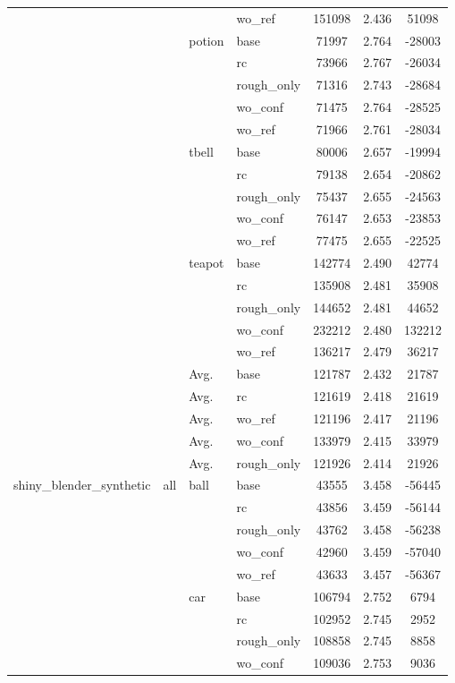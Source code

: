 \begin{table}[t]
{\begin{tabular}{llllccc}
 &  &  & wo\_ref & 151098 & 2.436 & 51098 \\
 &  & potion & base & 71997 & 2.764 & -28003 \\
 &  &  & rc & 73966 & 2.767 & -26034 \\
 &  &  & rough\_only & 71316 & 2.743 & -28684 \\
 &  &  & wo\_conf & 71475 & 2.764 & -28525 \\
 &  &  & wo\_ref & 71966 & 2.761 & -28034 \\
 &  & tbell & base & 80006 & 2.657 & -19994 \\
 &  &  & rc & 79138 & 2.654 & -20862 \\
 &  &  & rough\_only & 75437 & 2.655 & -24563 \\
 &  &  & wo\_conf & 76147 & 2.653 & -23853 \\
 &  &  & wo\_ref & 77475 & 2.655 & -22525 \\
 &  & teapot & base & 142774 & 2.490 & 42774 \\
 &  &  & rc & 135908 & 2.481 & 35908 \\
 &  &  & rough\_only & 144652 & 2.481 & 44652 \\
 &  &  & wo\_conf & 232212 & 2.480 & 132212 \\
 &  &  & wo\_ref & 136217 & 2.479 & 36217 \\
 & & Avg. & base & 121787 & 2.432 & 21787 \\
 & & Avg. & rc & 121619 & 2.418 & 21619 \\
 & & Avg. & wo\_ref & 121196 & 2.417 & 21196 \\
 & & Avg. & wo\_conf & 133979 & 2.415 & 33979 \\
 & & Avg. & rough\_only & 121926 & 2.414 & 21926 \\
\midrule
shiny\_blender\_synthetic & all & ball & base & 43555 & 3.458 & -56445 \\
 &  &  & rc & 43856 & 3.459 & -56144 \\
 &  &  & rough\_only & 43762 & 3.458 & -56238 \\
 &  &  & wo\_conf & 42960 & 3.459 & -57040 \\
 &  &  & wo\_ref & 43633 & 3.457 & -56367 \\
 &  & car & base & 106794 & 2.752 & 6794 \\
 &  &  & rc & 102952 & 2.745 & 2952 \\
 &  &  & rough\_only & 108858 & 2.745 & 8858 \\
 &  &  & wo\_conf & 109036 & 2.753 & 9036 \\

\end{tabular}}
\end{table}
